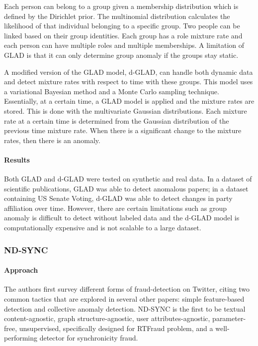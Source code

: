 \documentclass[11pt, oneside]{article}   	%
\begin{document}
\quad Each person can belong to a group given a membership distribution which is defined by the Dirichlet prior.
The multinomial distribution calculates the likelihood of that individual belonging to a specific group.
Two people can be linked based on their group identities.
Each group has a role mixture rate and each person can have multiple roles and multiple memberships.
A limitation of GLAD is that it can only determine group anomaly if the groups stay static.

\quad A modified version of the GLAD model, d-GLAD, can handle both dynamic data and detect mixture rates with respect to time with these groups.
This model uses a variational Bayesian method and a Monte Carlo sampling technique.
Essentially, at a certain time, a GLAD model is applied and the mixture rates are stored.
This is done with the multivariate Gaussian distributions.
Each mixture rate at a certain time is determined from the Gaussian distribution of the previous time mixture rate.
When there is a significant change to the mixture rates, then there is an anomaly.

\paragraph{Results}
\quad

\quad Both GLAD and d-GLAD were tested on synthetic and real data.
In a dataset of scientific publications, GLAD was able to detect anomalous papers; in a dataset containing US Senate Voting, d-GLAD was able to detect changes in party affiliation over time.
However, there are certain limitations such as group anomaly is difficult to detect without labeled data and the d-GLAD model is computationally expensive and is not scalable to a large dataset.

\subsubsection{ND-SYNC}

\paragraph{Approach}
\quad

\quad The authors first survey different forms of fraud-detection on Twitter,
citing two common tactics that are explored in several other papers: simple
feature-based detection and collective anomaly detection.  ND-SYNC \cite{ndsync} is the first
to be textual content-agnostic, graph structure-agnostic, user
attributes-agnostic, parameter-free, unsupervised, specifically designed for
RTFraud problem, and a well-performing detector for synchronicity fraud.  
\end{document}
